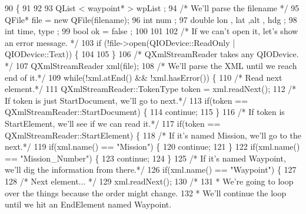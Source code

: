\begin{DoxyCode}
90                                                         \{
91 
92 
93         QList < waypoint* > wpList ;
94     \textcolor{comment}{/* We'll parse the filename */}
95         QFile* file = \textcolor{keyword}{new} QFile(filename);
96         \textcolor{keywordtype}{int} num  ;
97         \textcolor{keywordtype}{double} lon , lat ,alt , hdg ;
98         \textcolor{keywordtype}{int} time, type ;
99         \textcolor{keywordtype}{bool} ok = false ;
100 
101 
102         \textcolor{comment}{/* If we can't open it, let's show an error message. */}
103         \textcolor{keywordflow}{if} (!file->open(QIODevice::ReadOnly | QIODevice::Text)) \{
104 
105         \}
106         \textcolor{comment}{/* QXmlStreamReader takes any QIODevice. */}
107         QXmlStreamReader xml(file);
108         \textcolor{comment}{/* We'll parse the XML until we reach end of it.*/}
109         \textcolor{keywordflow}{while}(!xml.atEnd() && !xml.hasError()) \{
110             \textcolor{comment}{/* Read next element.*/}
111             QXmlStreamReader::TokenType token = xml.readNext();
112             \textcolor{comment}{/* If token is just StartDocument, we'll go to next.*/}
113             \textcolor{keywordflow}{if}(token == QXmlStreamReader::StartDocument) \{
114                 \textcolor{keywordflow}{continue};
115             \}
116             \textcolor{comment}{/* If token is StartElement, we'll see if we can read it.*/}
117             \textcolor{keywordflow}{if}(token == QXmlStreamReader::StartElement) \{
118                 \textcolor{comment}{/* If it's named Mission, we'll go to the next.*/}
119                 \textcolor{keywordflow}{if}(xml.name() == \textcolor{stringliteral}{"Mission"}) \{
120                     \textcolor{keywordflow}{continue};
121                 \}
122                 \textcolor{keywordflow}{if}(xml.name() == \textcolor{stringliteral}{"Mission\_Number"}) \{
123                     \textcolor{keywordflow}{continue};
124                 \}
125                 \textcolor{comment}{/* If it's named Waypoint, we'll dig the information from there.*/}
126                 \textcolor{keywordflow}{if}(xml.name() == \textcolor{stringliteral}{"Waypoint"}) \{
127 
128                     \textcolor{comment}{/* Next element... */}
129                     xml.readNext();
130                     \textcolor{comment}{/*}
131 \textcolor{comment}{                     * We're going to loop over the things because the order might change.}
132 \textcolor{comment}{                     * We'll continue the loop until we hit an EndElement named Waypoint.}

\end{DoxyCode}
